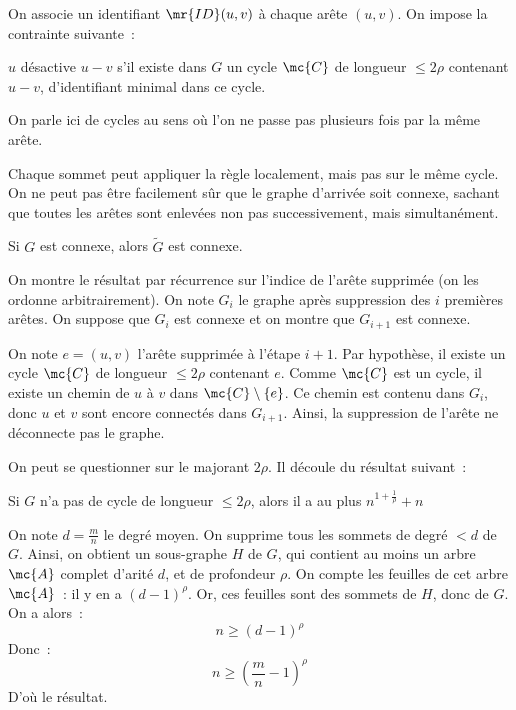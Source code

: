 \newcommand{\id}{\mr{ID}}

On associe un identifiant $\id(u,v)$ à chaque arête $(u,v)$. On impose la contrainte suivante~:
\begin{proposition}{}{}
  $u$ désactive $u-v$ s'il existe dans $G$ un cycle $\mc{C}$ de longueur $\leq 2\rho$ contenant $u-v$, d'identifiant minimal dans ce cycle.
\end{proposition}
On parle ici de cycles au sens où l'on ne passe pas plusieurs fois par la même arête.
\begin{remarque}{}{}
  Chaque sommet peut appliquer la règle localement, mais pas sur le même cycle. On ne peut pas être facilement sûr que le graphe d'arrivée soit connexe, sachant que toutes les arêtes sont enlevées non pas successivement, mais simultanément.
\end{remarque}

\begin{theoreme}{}{}
  Si $G$ est connexe, alors $\tilde{G}$ est connexe.
\end{theoreme}

\begin{demonstration}
  On montre le résultat par récurrence sur l'indice de l'arête supprimée (on les ordonne arbitrairement). On note $G_i$ le graphe après suppression des $i$ premières arêtes. On suppose que $G_i$ est connexe et on montre que $G_{i+1}$ est connexe. 

  On note $e = (u,v)$ l'arête supprimée à l'étape $i+1$. Par hypothèse, il existe un cycle $\mc{C}$ de longueur $\leq 2\rho$ contenant $e$. Comme $\mc{C}$ est un cycle, il existe un chemin de $u$ à $v$ dans $\mc{C} \setminus \{e\}$. Ce chemin est contenu dans $G_i$, donc $u$ et $v$ sont encore connectés dans $G_{i+1}$. Ainsi, la suppression de l'arête ne déconnecte pas le graphe.
\end{demonstration}

On peut se questionner sur le majorant $2 \rho$. Il découle du résultat suivant~:

\begin{theoreme}{}{}
  Si $G$ n'a pas de cycle de longueur $\leq 2\rho$, alors il a au plus $n^{1+\frac{1}{\rho}} + n$
\end{theoreme}


\begin{demonstration}
  On note $d = \frac{m}{n}$ le degré moyen. On supprime tous les sommets de degré $<d$ de $G$. Ainsi, on obtient un sous-graphe $H$ de $G$, qui contient au moins un arbre $\mc{A}$ complet d'arité $d$, et de profondeur $\rho$. On compte les feuilles de cet arbre $\mc{A}$~: il y en a $(d-1)^\rho$. Or, ces feuilles sont des sommets de $H$, donc de $G$. On a alors~:
  $$ n \geq (d-1)^\rho $$
Donc~: 
$$ n \geq \left(\frac{m}{n} - 1\right)^\rho $$
D'où le résultat.
\end{demonstration}
